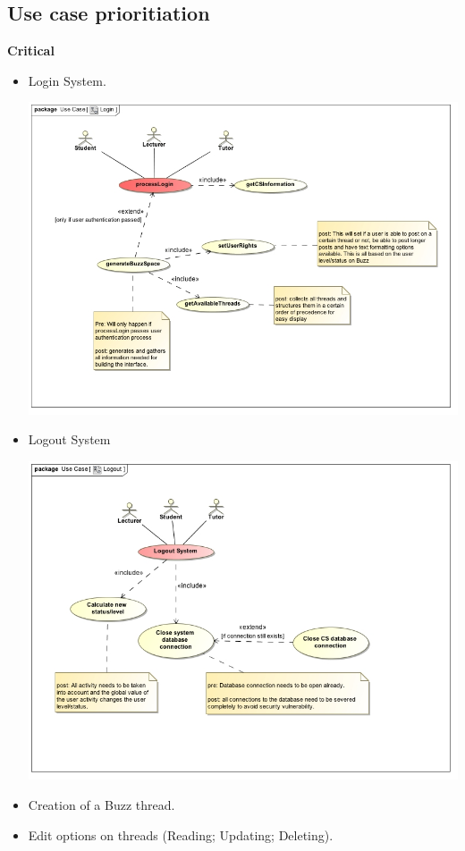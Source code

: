 \documentclass[a4paper,12pt]{report}
\begin{document}
\subsection{Use case prioritiation}
\textbf{Critical} 
\begin{itemize}
  \item Login System.
	\begin{center}
  	\includegraphics[width=1\textwidth]{../Functional_Requirements_DIagrams/UseCases/UseCase_Login.jpg}\\[0.4cm]    
	\end{center}
  \item Logout System
	\begin{center}
  	\includegraphics[width=1\textwidth]{../Functional_Requirements_DIagrams/UseCases/UseCase_Logout.jpg}\\[0.4cm]    
	\end{center}	
  \item Creation of a Buzz thread.
  \item Edit options on threads (Reading; Updating; Deleting).
\end{itemize} 
\end{document}
